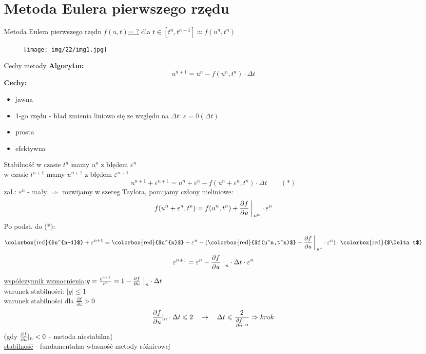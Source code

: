 \section{Metoda Eulera pierwszego rzędu}
\begin{frame}{Metoda Eulera pierwszego rzędu}
  \underline{$f(u,t)$= ?} \quad dla  \quad $t \in [t^n,t^{n+1}] \approx f(u^n,t^n)$
  \begin{figure}
	\texttt{[image: img/22/img1.jpg]}
	\end{figure}
\end{frame}
\begin{frame}{Cechy metody}
  \textbf{Algorytm:}
  $$u^{n+1} = u^n - f(u^n, t^n) \cdot \Delta t$$
  \textbf{Cechy:}
  \begin{itemize}
    \item jawna
    \item 1-go rzędu - bład zmienia liniowo się ze względu na $\Delta t$: \quad $\varepsilon=0(\Delta t)$
    \item prosta
    \item efektywna
  \end{itemize}
\end{frame}
\begin{frame}{Stabilność}
  w czasie $t^n$ mamy  $u^n$ z błędem $\varepsilon^n$  \\
  w czasie $t^{n+1}$ mamy $u^{n+1}$ z błędem $\varepsilon^{n+1}$ \\
  $$u^{n+1} + \varepsilon^{n+1} = u^n+\varepsilon^n-f(u^n+\varepsilon^n,t^n)\cdot \Delta t \qquad(*)$$
  \underline{zał.:} $\varepsilon^n$ - mały $\Rightarrow$ rozwijamy w szereg Taylora, pomijamy człony nieliniowe:
  $$f(u^n+\varepsilon^n,t^n) = f(u^n,t^n)+\frac{\partial f}{\partial u}{\bigg\arrowvert}_{u^n} \cdot \varepsilon^n$$
  Po podst. do (*):
   $$\textrm{\colorbox{red}{$u^{n+1}$}} + \varepsilon^{n+1} = \textrm{\colorbox{red}{$u^{n}$}}+\varepsilon^n-(\textrm{\colorbox{red}{$f(u^n,t^n)$}}+\frac{\partial f}{\partial u}{\bigg\arrowvert}_{u^n} \cdot \varepsilon^n) \cdot \textrm{\colorbox{red}{$\Delta t$}}$$
  $$\varepsilon^{n+1} = \varepsilon^n-\frac{\partial f}{\partial u}\big\arrowvert_n \cdot \Delta t \cdot \varepsilon^n $$
  \end{frame}
  \begin{frame}
  \underline{współczynnik wzmocnienia}:\qquad $g = \frac{\epsilon^{n+1}}{\epsilon^{n}}=1- \frac{\partial f}{\partial u}{\big\arrowvert}_n \cdot \Delta t$\\
  warunek stabilności: $|g|\leq1$\\
  warunek stabilności dla $\frac{\partial f}{\partial u}>0$
  $$\frac{\partial f}{\partial u}\arrowvert_n \cdot \Delta t \leqslant 2 \quad 
  \rightarrow \quad \Delta t \leqslant \frac{2}{\frac{\partial f}{\partial u}\arrowvert_n} \Rightarrow krok$$
  (gdy $\frac{\partial f}{\partial u}\arrowvert_n < 0$ - metoda niestabilna)\\
   \underline{stabilność} - fundamentalna własność metody różnicowej
\end{frame}

